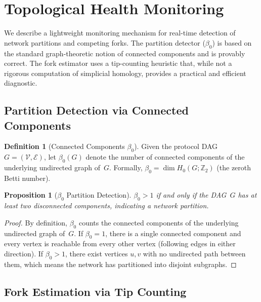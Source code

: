 \documentclass[11pt,a4paper]{article}
\newtheorem{proposition}[theorem]{Proposition}
\theoremstyle{definition}
\newtheorem{definition}[theorem]{Definition}
\theoremstyle{remark}
\newcommand{\vertices}{\mathcal{V}}
\newcommand{\edges}{\mathcal{E}}
\begin{document}
\section{Topological Health Monitoring}\label{sec:homology}

We describe a lightweight monitoring mechanism for real-time detection
of network partitions and competing forks.
The partition detector ($\beta_0$) is based on the standard graph-theoretic
notion of connected components and is provably correct.
The fork estimator uses a tip-counting heuristic that, while not a
rigorous computation of simplicial homology, provides a practical and
efficient diagnostic.

\subsection{Partition Detection via Connected Components}

\begin{definition}[Connected Components $\beta_0$]\label{def:betti}
Given the protocol DAG $G = (\vertices, \edges)$, let $\beta_0(G)$
denote the number of connected components of the underlying undirected
graph of~$G$.
Formally, $\beta_0 = \dim H_0(G; \mathbb{Z}_2)$ (the zeroth Betti
number).
\end{definition}

\begin{proposition}[$\beta_0$ Partition Detection]\label{prop:beta0}
$\beta_0 > 1$ if and only if the DAG~$G$ has at least two disconnected
components, indicating a network partition.
\end{proposition}

\begin{proof}
By definition, $\beta_0$ counts the connected components of the
underlying undirected graph of~$G$.
If $\beta_0 = 1$, there is a single connected component and every
vertex is reachable from every other vertex (following edges in either
direction).
If $\beta_0 > 1$, there exist vertices $u, v$ with no undirected path
between them, which means the network has partitioned into disjoint
subgraphs.
\end{proof}

\subsection{Fork Estimation via Tip Counting}
\end{document}
